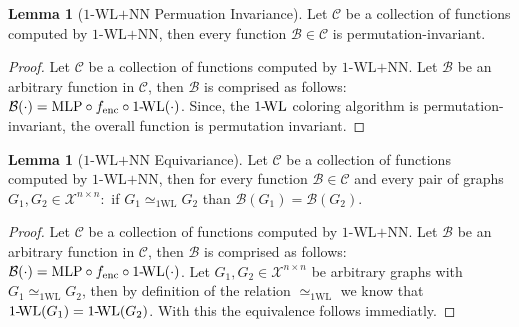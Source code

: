 \documentclass[11pt, dvipsnames, DIV=12]{scrreprt}
\theoremstyle{definition}
\newtheorem{lemma}[theorem]{Lemma}
\newcommand{\cB}{\mathcal{B}}
\newcommand{\cC}{\mathcal{C}}
\newcommand{\wlnn}{\text{1-WL+NN}}
\newcommand{\wliso}{\simeq_{\text{1WL}}}
\newcommand{\xnn}{\mathcal{X}^{n \times n}}
\newcommand{\wl}{\text{1-\!WL}}
\begin{document}
\begin{lemma}[$\wlnn$ Permuation Invariance]\label{lem:wlnn_permutation_invariance}
    Let $\cC$ be a collection of functions computed by $\wlnn$, then every function $\cB \in \cC$ is permutation-invariant.
\end{lemma}

\begin{proof}
    Let $\cC$ be a collection of functions computed by $\wlnn$. Let $\cB$ be an arbitrary function in $\cC$, then $\cB$ is comprised as follows: $\cB(\cdot) = \text{MLP} \circ f_{\text{enc}} \circ \wl(\cdot)$. Since, the $\wl$ coloring algorithm is permutation-invariant, the overall function is permutation invariant.
\end{proof}

\begin{lemma}[$\wlnn$ Equivariance]\label{lem:wl_relation_equivalence}
    Let $\cC$ be a collection of functions computed by $\wlnn$, then for every function $\cB \in \cC$ and every pair of graphs $G_1, G_2 \in \xnn:$ if $G_1 \wliso G_2$ than $\cB(G_1) = \cB(G_2)$.
\end{lemma}

\begin{proof}
    Let $\cC$ be a collection of functions computed by $\wlnn$. Let $\cB$ be an arbitrary function in $\cC$, then $\cB$ is comprised as follows: $\cB(\cdot) = \text{MLP} \circ f_{\text{enc}} \circ \wl(\cdot)$. Let $G_1, G_2 \in \xnn$ be arbitrary graphs with $G_1 \wliso G_2$, then by definition of the relation $\wliso$ we know that $\wl(G_1) = \wl(G_2)$. With this the equivalence follows immediatly.
\end{proof}
\end{document}
